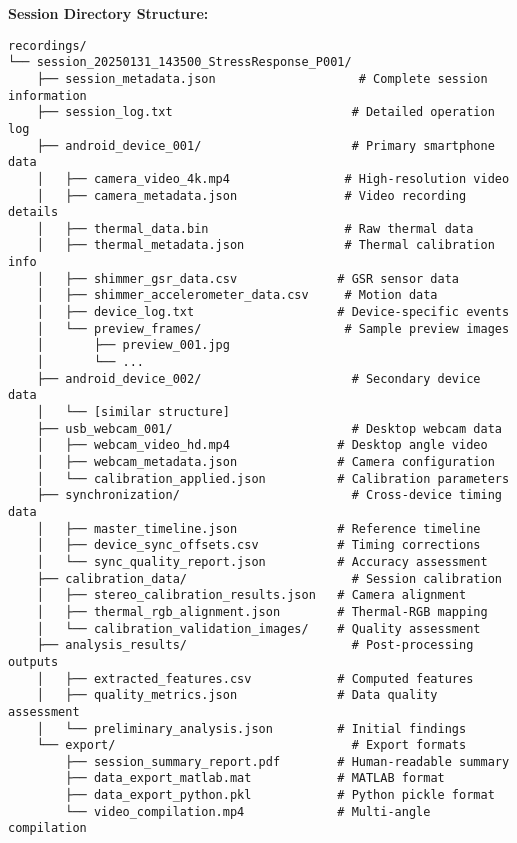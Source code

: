 \documentclass[12pt,a4paper]{article}
\begin{document}
\textbf{Session Directory Structure:}

\begin{verbatim}
recordings/
└── session_20250131_143500_StressResponse_P001/
    ├── session_metadata.json                    # Complete session information
    ├── session_log.txt                         # Detailed operation log
    ├── android_device_001/                     # Primary smartphone data
    │   ├── camera_video_4k.mp4                # High-resolution video
    │   ├── camera_metadata.json               # Video recording details
    │   ├── thermal_data.bin                   # Raw thermal data
    │   ├── thermal_metadata.json              # Thermal calibration info
    │   ├── shimmer_gsr_data.csv              # GSR sensor data
    │   ├── shimmer_accelerometer_data.csv     # Motion data
    │   ├── device_log.txt                    # Device-specific events
    │   └── preview_frames/                    # Sample preview images
    │       ├── preview_001.jpg
    │       └── ...
    ├── android_device_002/                     # Secondary device data
    │   └── [similar structure]
    ├── usb_webcam_001/                         # Desktop webcam data
    │   ├── webcam_video_hd.mp4               # Desktop angle video
    │   ├── webcam_metadata.json              # Camera configuration
    │   └── calibration_applied.json          # Calibration parameters
    ├── synchronization/                        # Cross-device timing data
    │   ├── master_timeline.json              # Reference timeline
    │   ├── device_sync_offsets.csv           # Timing corrections
    │   └── sync_quality_report.json          # Accuracy assessment
    ├── calibration_data/                       # Session calibration
    │   ├── stereo_calibration_results.json   # Camera alignment
    │   ├── thermal_rgb_alignment.json        # Thermal-RGB mapping
    │   └── calibration_validation_images/    # Quality assessment
    ├── analysis_results/                       # Post-processing outputs
    │   ├── extracted_features.csv            # Computed features
    │   ├── quality_metrics.json              # Data quality assessment
    │   └── preliminary_analysis.json         # Initial findings
    └── export/                                 # Export formats
        ├── session_summary_report.pdf        # Human-readable summary
        ├── data_export_matlab.mat            # MATLAB format
        ├── data_export_python.pkl            # Python pickle format
        └── video_compilation.mp4             # Multi-angle compilation
\end{verbatim}
\end{document}
